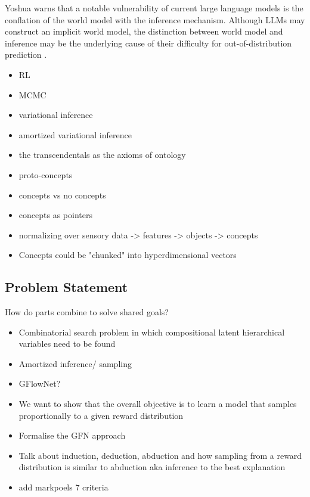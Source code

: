 Yoshua warns that a notable vulnerability of current large language models is the conflation of the world model with the inference mechanism. Although LLMs may construct an implicit world model, the distinction between world model and inference may be the underlying cause of their difficulty for out-of-distribution prediction \cite{goyal_inductive_2022, yoshuabengioScalingService}.

\begin{itemize}
    \item RL
    \item MCMC
    \item variational inference
    \item amortized variational inference
\end{itemize}

\begin{itemize}
    \item the transcendentals as the axioms of ontology
    \item proto-concepts
    \item concepts vs no concepts
    \item concepts as pointers
    \item normalizing over sensory data -> features -> objects -> concepts 
    \item Concepts could be "chunked" into hyperdimensional vectors
\end{itemize}

\subsection{Problem Statement}
How do parts combine to solve shared goals?


\begin{itemize}
    \item Combinatorial search problem in which compositional latent hierarchical variables need to be found
    \item Amortized inference/ sampling
    \item GFlowNet?
    \item We want to show that the overall objective is to learn a model that samples proportionally to a given reward distribution
    \item Formalise the GFN approach
    \item Talk about induction, deduction, abduction and how sampling from a reward distribution is similar to abduction aka inference to the best explanation
    \item add markpoels 7 criteria 
\end{itemize}



